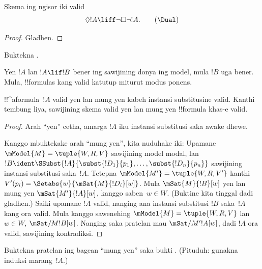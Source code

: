 \documentclass[../../../include/open-logic-section]{subfiles}
\begin{document}
\begin{prop}
  Skema \Dual{} ing ngisor iki valid
  \begin{equation*}
  \Diamond !A \liff \lnot\Box\lnot !A. \tag{\Dual}
  \end{equation*}
\end{prop}

\begin{proof}
  Gladhen.
\end{proof}

\begin{prob}
  Buktekna .
\end{prob}

\begin{prop}
  Yen $!A$ lan $!A \lif !B$ bener ing sawijining donya ing model,
  mula $!B$ uga bener. Mula, !!{formula}s kang valid katutup
  miturut modus ponens.
\end{prop}

\begin{prop}
  !!^a{formula}~$!A$ valid yen lan mung yen kabeh instansi substitusine
  valid. Kanthi tembung liya, sawijining skema valid yen lan mung yen
  !!{formula} khas-e valid.
\end{prop}

\begin{proof}
  Arah ``yen'' cetha, amarga $!A$ iku instansi substitusi saka
  awake dhewe.

Kanggo mbuktekake arah ``mung yen'', kita nuduhake iki: Upamane
  $\mModel{M} = \tuple{W, R, V}$ sawijining model modal, lan $!B \ident
  \SSubst{!A}{\subst{!D_1}{p_1},\dots,\subst{!D_n}{p_n}}$ sawijining
  instansi substitusi saka~$!A$. Tetepna $\mModel{M'} = \tuple{W, R,
    V'}$ kanthi $V'(p_i) = \Setabs{w}{\mSat{M}{!D_i}[w]}$. Mula
  $\mSat{M}{!B}[w]$ yen lan mung yen $\mSat{M'}{!A}[w]$, kanggo saben~$w \in W$.
  (Buktine kita tinggal dadi gladhen.) Saiki upamane $!A$ valid,
  nanging ana instansi substitusi $!B$ saka~$!A$ kang ora valid. Mula
  kanggo sawenehing $\mModel{M} = \tuple{W, R, V}$ lan $w \in W$,
  $\mSat/{M}{!B}[w]$. Nanging saka pratelan mau $\mSat/{M'}{!A}[w]$,
  dadi $!A$ ora valid, sawijining kontradiksi.
\end{proof}

\begin{prob}
  Buktekna pratelan ing bagean ``mung yen'' saka bukti
  . (Pituduh: gunakna induksi
  marang~$!A$.)
\end{prob}
\end{document}
